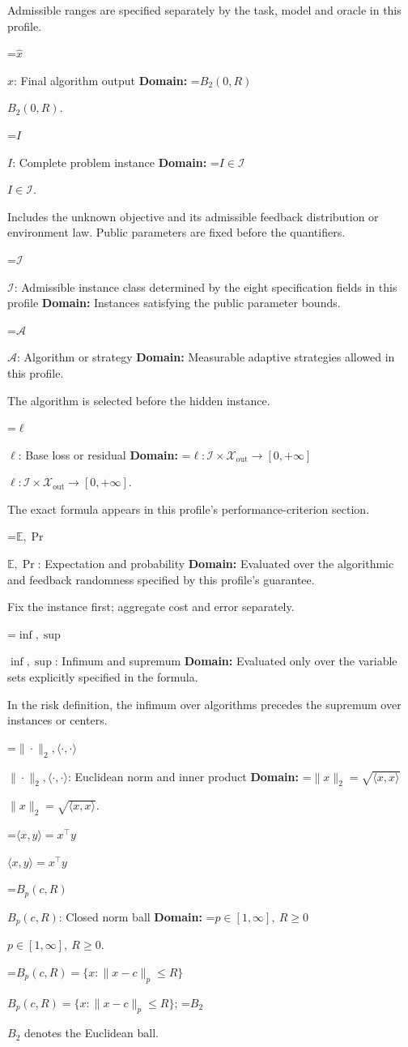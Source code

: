 \documentclass[10pt,a4paper]{article}
\newcommand{\AtlasMath}[1]{\par\begingroup\centering\setbox0=\hbox{$\displaystyle #1$}\ifdim\wd0>1.4\linewidth\typeout{ATLAS WIDE FORMULA: \the\wd0}\fi\ifdim\wd0>\linewidth\resizebox{\linewidth}{!}{\box0}\else\box0\fi\par\endgroup}
\newcommand{\AtlasInlineMath}[1]{\begingroup\setbox0=\hbox{$#1$}\ifdim\wd0>.4\linewidth\endgroup\AtlasMath{#1}\else\endgroup$#1$\fi}
\begin{document}
Admissible ranges are specified separately by the task, model and oracle in this profile.

\AtlasInlineMath{\widehat{x}}: Final algorithm output \textbf{Domain:} \AtlasInlineMath{B_2(0,R)}.

\AtlasInlineMath{I}: Complete problem instance \textbf{Domain:} \AtlasInlineMath{I\in\mathcal{I}}.

Includes the unknown objective and its admissible feedback distribution or environment law. Public parameters are fixed before the quantifiers.

\AtlasInlineMath{\mathcal{I}}: Admissible instance class determined by the eight specification fields in this profile \textbf{Domain:} Instances satisfying the public parameter bounds.

\AtlasInlineMath{\mathcal{A}}: Algorithm or strategy \textbf{Domain:} Measurable adaptive strategies allowed in this profile.

The algorithm is selected before the hidden instance.

\AtlasInlineMath{\ell}: Base loss or residual \textbf{Domain:} \AtlasInlineMath{\ell:\mathcal{I}\times\mathcal{X}_{\mathrm{out}}\to[0,+\infty]}.

The exact formula appears in this profile's performance-criterion section.

\AtlasInlineMath{\mathbb{E},\Pr}: Expectation and probability \textbf{Domain:} Evaluated over the algorithmic and feedback randomness specified by this profile's guarantee.

Fix the instance first; aggregate cost and error separately.

\AtlasInlineMath{\inf,\sup}: Infimum and supremum \textbf{Domain:} Evaluated only over the variable sets explicitly specified in the formula.

In the risk definition, the infimum over algorithms precedes the supremum over instances or centers.

\AtlasInlineMath{\|\cdot\|_2,\langle\cdot,\cdot\rangle}: Euclidean norm and inner product \textbf{Domain:} \AtlasInlineMath{\|x\|_2=\sqrt{\langle x,x\rangle}}.

\AtlasInlineMath{\langle x,y\rangle=x^\top y}

\AtlasInlineMath{B_p(c,R)}: Closed norm ball \textbf{Domain:} \AtlasInlineMath{p\in[1,\infty],\ R\ge0}.

\AtlasInlineMath{B_p(c,R)=\{x:\|x-c\|_p\le R\}}; \AtlasInlineMath{B_2} denotes the Euclidean ball.
\end{document}
